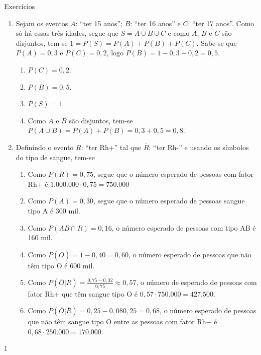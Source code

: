 \begin{answer}{Exercícios}
{\begin{enumerate}
\item Sejam os eventos $A$: “ter 15 anos”; $B$: “ter 16 anos” e $C$: “ter 17 anos”. Como só há essas três idades, segue que $S=A\cup B\cup C$ e como $A$, $B$ e $C$ são disjuntos, tem-se $1=P(S)=P(A)+P(B)+P(C)$. Sabe-se que $P(A)=0{,}3$ e $P(C)=0{,}2$, logo $P(B)=1-0{,}3-0{,}2=0{,}5$.
\begin{enumerate}
\item $P(C)=0{,}2$.
\item $P(B)=0{,}5$.
\item $P(S)=1$.
\item Como $A$ e $B$ são disjuntos, tem-se $P(A\cup B)=P(A)+P(B)=0{,}3+0{,}5=0{,}8$.
\end{enumerate}
\item Definindo o evento $R$: “ter Rh+” tal que $\overline{R}$: “ter Rh-” e usando os símbolos do tipo de sangue, tem-se
\begin{enumerate}[wide]
\item Como $P(R)=0{,}75$, segue que o número esperado de pessoas com fator Rh+ é $1.000.000\cdot 0{,}75=750.000$
\item Como $P(A)=0{,}30$, segue que o número esperado de pessoas sangue tipo A é $300$ mil.
\item Como $P(AB\cap R)=0{,}16$, o número esperado de pessoas com tipo AB é 160 mil.
\item Como $P(\overline{O})=1-0{,}40=0{,}60$, o número esperado de pessoas que não têm tipo O é $600$ mil.
\item Como $P(\overline{O}|R)=\frac{0{,}75-0{,}32}{0{,}75}\approx0{,}57$, o número de esperado de pessoas com fator Rh+ que têm sangue tipo O é $0{,}57\cdot750.000=427.500$.
\item Como $P(\overline{O}|\overline{R})=0{,}25-0{,}080{,}25=0{,}68$, o número esperado de pessoas que não têm sangue tipo O entre as pessoas com fator Rh− é $0{,}68\cdot250.000=170.000$.
\end{enumerate}

\end{enumerate}
}{1}
\end{answer}
\clearmargin

